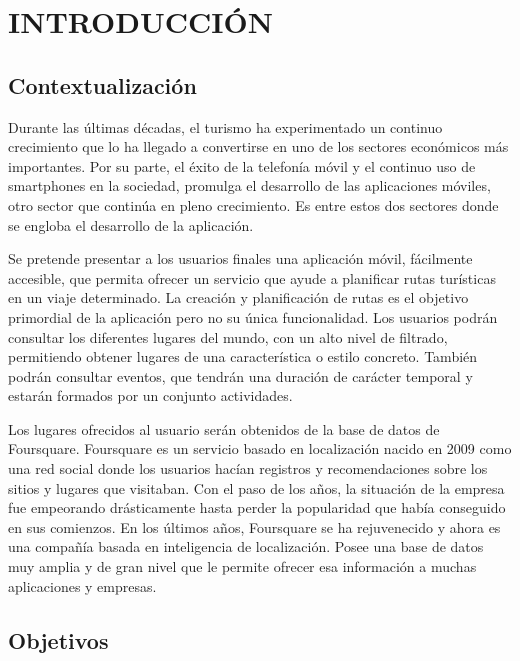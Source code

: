 \setcounter{page}{1}
\chapter[Introducción]{
  \label{chp:introduccion}
  INTRODUCCIÓN
}
\thispagestyle{numberingStyle}
\pagestyle{numberingStyle}


\section{Contextualización}
Durante las últimas décadas, el turismo ha experimentado un continuo crecimiento que lo ha llegado a convertirse en uno de los sectores económicos más importantes. Por su parte, el éxito de la telefonía móvil y el continuo uso de smartphones en la sociedad, promulga el desarrollo de las aplicaciones móviles, otro sector que continúa en pleno crecimiento. Es entre estos dos sectores donde se engloba el desarrollo de la aplicación.

Se pretende presentar a los usuarios finales una aplicación móvil, fácilmente accesible, que permita ofrecer un servicio que ayude a planificar rutas turísticas en un viaje determinado. La creación y planificación de rutas es el objetivo primordial de la aplicación pero no su única funcionalidad. Los usuarios podrán consultar los diferentes lugares del mundo, con un alto nivel de filtrado, permitiendo obtener lugares de una característica o estilo concreto. También podrán consultar eventos, que tendrán una duración de carácter temporal y estarán formados por un conjunto actividades.

Los lugares ofrecidos al usuario serán obtenidos de la base de datos de Foursquare. Foursquare es un servicio basado en localización nacido en 2009 como una red social donde los usuarios hacían registros y recomendaciones sobre los sitios y lugares que visitaban. Con el paso de los años, la situación de la empresa fue empeorando drásticamente hasta perder la popularidad que había conseguido en sus comienzos. En los últimos años, Foursquare se ha rejuvenecido y ahora es una compañía basada en inteligencia de localización. Posee una base de datos muy amplia y de gran nivel que le permite ofrecer esa información a muchas aplicaciones y empresas.







\section{Objetivos}

